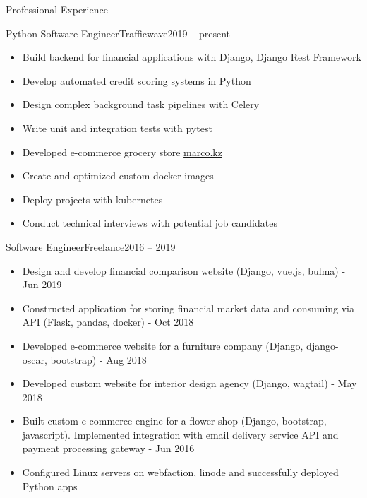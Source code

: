 \documentclass[]{mcdowellcv}
\begin{document}
\makeheader

\begin{cvsection}{Professional Experience}
  \begin{cvsubsection}{Python Software Engineer}{Trafficwave}{2019 -- present}
    \begin{itemize}
      \item Build backend for financial applications with Django, Django Rest Framework
      \item Develop automated credit scoring systems in Python
      \item Design complex background task pipelines with Celery
      \item Write unit and integration tests with pytest
      \item Developed e-commerce grocery store \href{https://marco.kz/}{marco.kz}
      \item Create and optimized custom docker images
      \item Deploy projects with kubernetes
      \item Conduct technical interviews with potential job candidates
    \end{itemize}
  \end{cvsubsection}

  \begin{cvsubsection}{Software Engineer}{Freelance}{2016 -- 2019}
    \begin{itemize}
      \item Design and develop financial comparison website (Django, vue.js, bulma) - Jun 2019
      \item Constructed application for storing financial market data and consuming via API (Flask, pandas, docker) - Oct 2018
      \item Developed e-commerce website for a furniture company (Django, django-oscar, bootstrap) - Aug 2018
      \item Developed custom website for interior design agency (Django, wagtail) - May 2018
      \item Built custom e-commerce engine for a flower shop (Django, bootstrap, javascript). Implemented integration with email delivery service API and payment processing gateway - Jun 2016
      \item Configured Linux servers on webfaction, linode and successfully deployed Python apps
    \end{itemize}
  \end{cvsubsection}


\end{cvsection}
\end{document}
